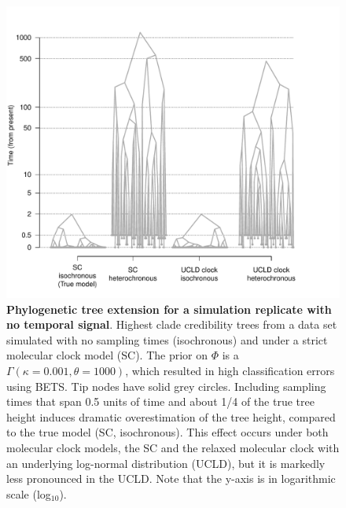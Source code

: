 \documentclass[10pt,letterpaper]{article}
\begin{document}
\begin{figure}[h!]
	\begin{center}
		\includegraphics[width=15cm]{sandbox_figures/tree_distortion_ultrametric.pdf}\newline
		\vspace{-0.5cm}
		\caption{\textbf{Phylogenetic tree extension for a simulation replicate with no temporal signal}. Highest clade credibility trees from a data set simulated with no sampling times (isochronous) and under a strict molecular clock model (SC). The prior on $\Phi$ is a $\Gamma(\kappa=0.001, \theta=1000)$, which resulted in high classification errors using BETS. Tip nodes have solid grey circles. Including sampling times that span 0.5 units of time and about 1/4 of the true tree height induces dramatic overestimation of the tree height, compared to the true model (SC, isochronous). This effect  occurs under both molecular clock models, the SC and the relaxed molecular clock with an underlying log-normal distribution (UCLD), but it is markedly less pronounced in the UCLD. Note that the y-axis is in logarithmic scale (log$_{10}$).}
		\label{figure:ultrametric_tree_distortion}
	\end{center}
\end{figure}
\end{document}
